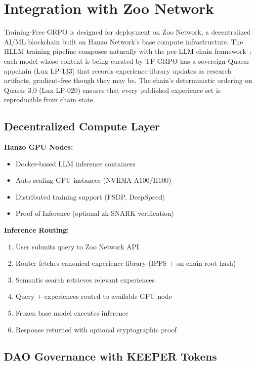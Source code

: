 \section{Integration with Zoo Network}

\label{sec:governance}

Training-Free GRPO is designed for deployment on Zoo Network, a decentralized AI/ML blockchain built on Hanzo Network's base compute infrastructure. The HLLM training pipeline composes naturally with the per-LLM chain framework~\cite{zoo-per-llm-chains}: each model whose context is being curated by TF-GRPO has a sovereign Quasar appchain (Lux LP-133) that records experience-library updates as research artifacts, gradient-free though they may be. The chain's deterministic ordering on Quasar 3.0 (Lux LP-020) ensures that every published experience set is reproducible from chain state.

\subsection{Decentralized Compute Layer}

\textbf{Hanzo GPU Nodes:}
\begin{itemize}
    \item Docker-based LLM inference containers
    \item Auto-scaling GPU instances (NVIDIA A100/H100)
    \item Distributed training support (FSDP, DeepSpeed)
    \item Proof of Inference (optional zk-SNARK verification)
\end{itemize}

\textbf{Inference Routing:}
\begin{enumerate}
    \item User submits query to Zoo Network API
    \item Router fetches canonical experience library (IPFS + on-chain root hash)
    \item Semantic search retrieves relevant experiences
    \item Query + experiences routed to available GPU node
    \item Frozen base model executes inference
    \item Response returned with optional cryptographic proof
\end{enumerate}

\subsection{DAO Governance with KEEPER Tokens}

